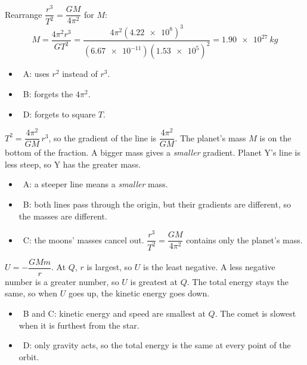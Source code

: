 \documentclass[12pt]{article}
\begin{document}
\begin{practiceanswers}
\begin{practiceans}
  Rearrange $\dfrac{r^3}{T^2} = \dfrac{GM}{4\pi^2}$ for $M$:
  \[ M = \frac{4\pi^2 r^3}{GT^2}
       = \frac{4\pi^2 (\num{4.22e8})^3}{(\num{6.67e-11})(\num{1.53e5})^2}
       = \qty{1.90e27}{kg} \]
  \begin{itemize}
    \item \xmark\ A: uses $r^2$ instead of $r^3$.
    \item \xmark\ B: forgets the $4\pi^2$.
    \item \xmark\ D: forgets to square $T$.
  \end{itemize}
\end{practiceans}

\begin{practiceans}
  $T^2 = \dfrac{4\pi^2}{GM}\, r^3$, so the gradient of the line is $\dfrac{4\pi^2}{GM}$. The
  planet's mass $M$ is on the bottom of the fraction. A bigger mass gives a \emph{smaller}
  gradient. Planet Y's line is less steep, so Y has the greater mass.
  \begin{itemize}
    \item \xmark\ A: a steeper line means a \emph{smaller} mass.
    \item \xmark\ B: both lines pass through the origin, but their gradients are different, so the
          masses are different.
    \item \xmark\ C: the moons' masses cancel out. $\dfrac{r^3}{T^2} = \dfrac{GM}{4\pi^2}$ contains
          only the planet's mass.
  \end{itemize}
\end{practiceans}

\begin{practiceans}
  $U = -\dfrac{GMm}{r}$. At $Q$, $r$ is largest, so $U$ is the least negative. A less negative
  number is a greater number, so $U$ is greatest at $Q$. The total energy stays the same, so when
  $U$ goes up, the kinetic energy goes down.
  \begin{itemize}
    \item \xmark\ B and C: kinetic energy and speed are smallest at $Q$. The comet is slowest when it
          is furthest from the star.
    \item \xmark\ D: only gravity acts, so the total energy is the same at every point of the orbit.
  \end{itemize}
\end{practiceans}


\end{practiceanswers}
\end{document}
